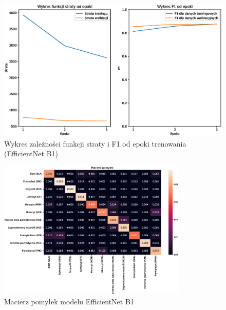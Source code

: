 \begin{figure}
    \centering
    \includegraphics[width=\textwidth]{experiments/efficientnet_b1/combined}
    \caption{Wykres zależności funkcji straty i F1 od epoki trenowania (EfficientNet B1)}
    \label{fig:plot_efficientnet_b1}
\end{figure}
\begin{figure}
    \centering
    \includegraphics[width=0.8\textwidth]{experiments/efficientnet_b1/confusion_matrix}
    \caption{Macierz pomyłek modelu EfficientNet B1}
    \label{fig:confusion_efficientnet_b1}
\end{figure}

